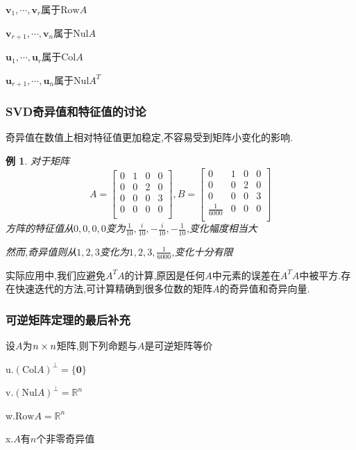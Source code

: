 \documentclass{article}
\newtheorem{example}{例}[subsection]
\newcommand{\RR}{\mathbb{R}}
\newcommand{\parameter}[1]{\left(#1\right)}
\newcommand{\ve}{\boldsymbol}
\newcommand{\col}{\text{Col}}
\newcommand{\row}{\text{Row}}
\newcommand{\nul}{\text{Nul}}
\begin{document}
\begin{CJK}{UTF8}{gkai}
$\ve{v}_1,\cdots , \ve{v}_r$属于$\row A$

$\ve{v}_{r + 1},\cdots ,\ve{v}_n$属于$\nul A$

$\ve{u}_1,\cdots , \ve{u}_r$属于$\col A$

$\ve{u}_{r + 1},\cdots , \ve{u}_n$属于$\nul A^T$

\subsubsection{SVD奇异值和特征值的讨论}
奇异值在数值上相对特征值更加稳定,不容易受到矩阵小变化的影响.
\begin{example}
    对于矩阵
    \[ A = 
    \begin{bmatrix}
        0&1&0&0\\
        0&0&2&0\\
        0&0&0&3\\
        0&0&0&0\\
    \end{bmatrix}
    ,
    B =
    \begin{bmatrix}
        0&1&0&0\\
        0&0&2&0\\
        0&0&0&3\\
        \frac{1}{6000}&0&0&0\\
    \end{bmatrix}
    \]
    方阵的特征值从$0,0,0,0$变为$\frac{1}{10},\frac{i}{10},-\frac{i}{10},-\frac{1}{10}$,变化幅度相当大

    然而,奇异值则从$1,2,3$变化为$1,2,3,\frac{1}{6000}$,变化十分有限
\end{example}

实际应用中,我们应避免$A^T A$的计算,原因是任何$A$中元素的误差在$A^TA$中被平方.存在快速迭代的方法,可计算精确到很多位数的矩阵$A$的奇异值和奇异向量. 

\subsubsection{可逆矩阵定理的最后补充}
设$A$为$n\times n$矩阵,则下列命题与$A$是可逆矩阵等价

u.$\parameter{\col A}^\bot = \{\ve{0}\}$

v.$\parameter{\nul A}^\bot = \RR^n$

w.$\row A = \RR^n$

x.$A$有$n$个非零奇异值

\end{CJK}
\end{document}
